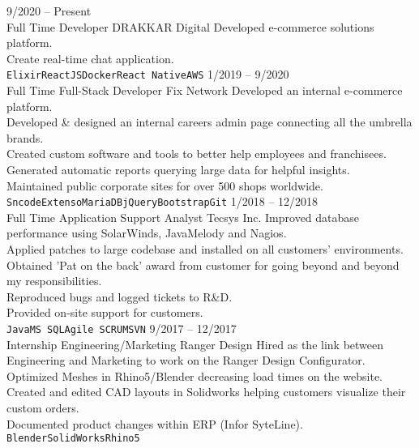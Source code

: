\documentclass[9pt]{developercv} %
\begin{document}
\begin{entrylist}
	\entry
		{9/2020 -- Present\\\footnotesize{Full Time}}
		{Developer}
		{DRAKKAR Digital}
		{Developed e-commerce solutions platform.\\
      Create real-time chat application.
      \\\texttt{Elixir}\slashsep\texttt{ReactJS}\slashsep\texttt{Docker}\slashsep\texttt{React Native}\slashsep\texttt{AWS}}
	\entry
		{1/2019 -- 9/2020\\\footnotesize{Full Time}}
		{Full-Stack Developer}
		{Fix Network}
		{Developed an internal e-commerce platform.\\
      Developed \& designed an internal careers admin page connecting all the umbrella brands.\\
      Created custom software and tools to better help employees and franchisees.\\
      Generated automatic reports querying large data for helpful insights.\\ 
      Maintained public corporate sites for over 500 shops worldwide.
      \\\texttt{Sncode}\slashsep\texttt{Extenso}\slashsep\texttt{MariaDB}\slashsep\texttt{jQuery}\slashsep\texttt{Bootstrap}\slashsep\texttt{Git}}
	\entry
		{1/2018 -- 12/2018\\\footnotesize{Full Time}}
		{Application Support Analyst}
		{Tecsys Inc.}
		{Improved database performance using SolarWinds, JavaMelody and Nagios.\\
      Applied patches to large codebase and installed on all customers' environments.\\
      Obtained 'Pat on the back' award from customer for going beyond and beyond my responsibilities.\\
      Reproduced bugs and logged tickets to R\&D.\\
      Provided on-site support for customers.
      \\\texttt{Java}\slashsep\texttt{MS SQL}\slashsep\texttt{Agile SCRUM}\slashsep\texttt{SVN}}
	\entry
		{9/2017 -- 12/2017\\\footnotesize{Internship}}
		{Engineering/Marketing}
		{Ranger Design}
    {Hired as the link between Engineering and Marketing to work on the Ranger Design Configurator.\\
      Optimized Meshes in Rhino5/Blender decreasing load times on the website.\\
      Created and edited CAD layouts in Solidworks helping customers visualize their custom orders.\\
      Documented product changes within ERP (Infor SyteLine). 
      \\\texttt{Blender}\slashsep\texttt{SolidWorks}\slashsep\texttt{Rhino5}}
\end{entrylist}
\end{document}
